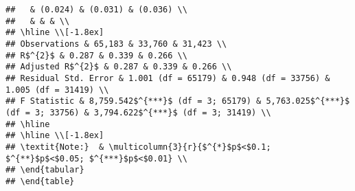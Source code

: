 \documentclass{article}\usepackage[]{graphicx}\usepackage[]{color}
\makeatletter
\newenvironment{kframe}{%
 \def\at@end@of@kframe{}%
 \ifinner\ifhmode%
  \def\at@end@of@kframe{\end{minipage}}%
  \begin{minipage}{\columnwidth}%
 \fi\fi%
 \def\FrameCommand##1{\hskip\@totalleftmargin \hskip-\fboxsep
 \colorbox{shadecolor}{##1}\hskip-\fboxsep
     \hskip-\linewidth \hskip-\@totalleftmargin \hskip\columnwidth}%
 \MakeFramed {\advance\hsize-\width
   \@totalleftmargin\z@ \linewidth\hsize
   \@setminipage}}%
 {\par\unskip\endMakeFramed%
 \at@end@of@kframe}
\newenvironment{knitrout}{}{} %
\makeatother
\begin{document}
\begin{knitrout}
\begin{kframe}
\begin{verbatim}
##   & (0.024) & (0.031) & (0.036) \\ 
##   & & & \\ 
## \hline \\[-1.8ex] 
## Observations & 65,183 & 33,760 & 31,423 \\ 
## R$^{2}$ & 0.287 & 0.339 & 0.266 \\ 
## Adjusted R$^{2}$ & 0.287 & 0.339 & 0.266 \\ 
## Residual Std. Error & 1.001 (df = 65179) & 0.948 (df = 33756) & 1.005 (df = 31419) \\ 
## F Statistic & 8,759.542$^{***}$ (df = 3; 65179) & 5,763.025$^{***}$ (df = 3; 33756) & 3,794.622$^{***}$ (df = 3; 31419) \\ 
## \hline 
## \hline \\[-1.8ex] 
## \textit{Note:}  & \multicolumn{3}{r}{$^{*}$p$<$0.1; $^{**}$p$<$0.05; $^{***}$p$<$0.01} \\ 
## \end{tabular} 
## \end{table}
\end{verbatim}
\end{kframe}
\end{knitrout}
\end{document}
